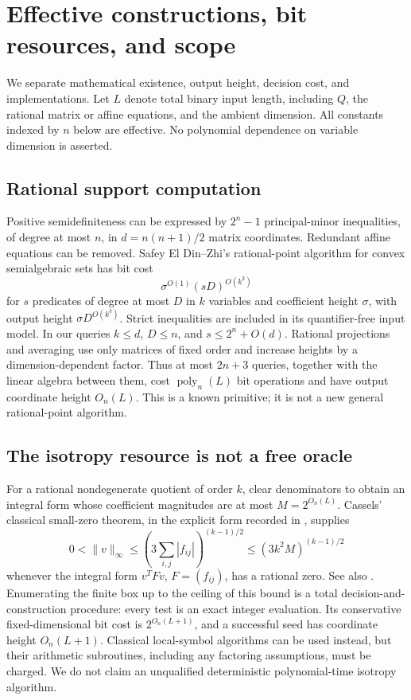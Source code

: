 \section{Effective constructions, bit resources, and scope}
We separate mathematical existence, output height, decision cost, and implementations. Let $L$ denote total binary input length, including $Q$, the rational matrix or affine equations, and the ambient dimension. All constants indexed by $n$ below are effective. No polynomial dependence on variable dimension is asserted.

\subsection{Rational support computation}
Positive semidefiniteness can be expressed by $2^n-1$ principal-minor inequalities, of degree at most $n$, in $d=n(n+1)/2$ matrix coordinates. Redundant affine equations can be removed. Safey El Din--Zhi's rational-point algorithm for convex semialgebraic sets \cite[Theorem 1.1]{SEDZ} has bit cost
\[
 \sigma^{O(1)}(sD)^{O(k^3)}
\]
for $s$ predicates of degree at most $D$ in $k$ variables and coefficient height $\sigma$, with output height $\sigma D^{O(k^3)}$. Strict inequalities are included in its quantifier-free input model. In our queries $k\leq d$, $D\leq n$, and $s\leq2^n+O(d)$. Rational projections and averaging use only matrices of fixed order and increase heights by a dimension-dependent factor. Thus at most $2n+3$ queries, together with the linear algebra between them, cost $\operatorname{poly}_n(L)$ bit operations and have output coordinate height $O_n(L)$. This is a known primitive; it is not a new general rational-point algorithm.

\subsection{The isotropy resource is not a free oracle}
For a rational nondegenerate quotient of order $k$, clear denominators to obtain an integral form whose coefficient magnitudes are at most $M=2^{O_n(L)}$. Cassels' classical small-zero theorem, in the explicit form recorded in \cite[Theorem 1.1]{Fukshansky}, supplies
\[
 0<\|v\|_\infty\leq
 \left(3\sum_{i,j}|f_{ij}|\right)^{(k-1)/2}
 \leq(3k^2M)^{(k-1)/2}
\]
whenever the integral form $v^TFv$, $F=(f_{ij})$, has a rational zero. See also \cite{CasselsSmall,CasselsBook,Dietmann}. Enumerating the finite box up to the ceiling of this bound is a total decision-and-construction procedure: every test is an exact integer evaluation. Its conservative fixed-dimensional bit cost is $2^{O_n(L+1)}$, and a successful seed has coordinate height $O_n(L+1)$. Classical local-symbol algorithms can be used instead, but their arithmetic subroutines, including any factoring assumptions, must be charged. We do not claim an unqualified deterministic polynomial-time isotropy algorithm.

